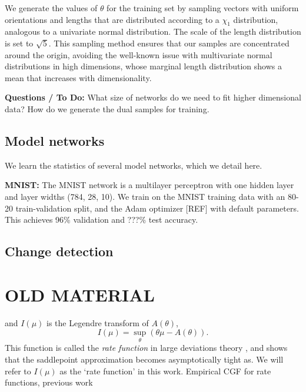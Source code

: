 \documentclass[11pt]{article}      %
\begin{document}
We generate the values of $\theta$ for the training set by sampling vectors with uniform orientations and lengths that are distributed according to a $\chi_1$ distribution, analogous to a univariate normal distribution.
The scale of the length distribution is set to $\sqrt{5}$.
This sampling method ensures that our samples are concentrated around the origin, avoiding the well-known issue with multivariate normal distributions in high dimensions, whose marginal length distribution shows a mean that increases with dimensionality.


\noindent \textbf{Questions / To Do:}
What size of networks do we need to fit higher dimensional data?
How do we generate the dual samples for training.




\subsection{Model networks} \label{sec:model_network_details}
We learn the statistics of several model networks, which we detail here.

\noindent \textbf{MNIST:} The MNIST network is a multilayer perceptron with one hidden layer and layer widths (784, 28, 10).
We train on the MNIST training data with an 80-20 train-validation split, and the Adam optimizer [REF] with default parameters.
This achieves 96\% validation and ???\% test accuracy.



\subsection{Change detection}



\section{OLD MATERIAL}

 and $I(\mu)$ is the Legendre transform of $A(\theta)$,
\begin{equation}
  I(\mu) = \sup_{\theta}( \theta \mu - A(\theta) ).
\end{equation}
This function is called the \textit{rate function} in large deviations theory \cite{dembo2009large}, and shows that the saddlepoint approximation becomes asymptotically tight as.
We will refer to $I(\mu)$ as the `rate function' in this work.
Empirical CGF for rate functions, previous work
\end{document}
